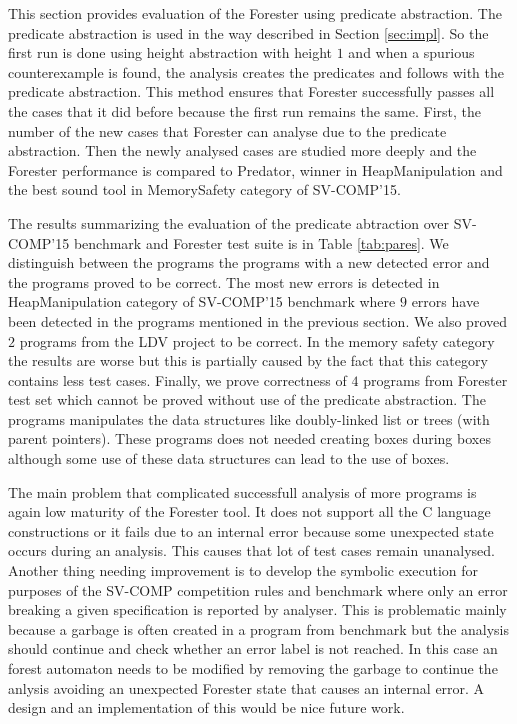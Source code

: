 This section provides evaluation of the Forester using predicate abstraction.
The predicate abstraction is used in the way described in Section \ref{sec:impl}.
So the first run is done using height abstraction with height $1$ and when a spurious
counterexample is found, the analysis creates the predicates and follows with
the predicate abstraction.
This method ensures that Forester successfully passes all the cases that it did
before because the first run remains the same.
First, the number of the new cases that Forester can analyse due to
the predicate abstraction.
Then the newly analysed cases are studied more deeply and
the Forester performance is compared to Predator, winner in HeapManipulation
and the best sound tool in MemorySafety category of SV-COMP'15.

The results summarizing the evaluation of the predicate abtraction over SV-COMP'15
benchmark and Forester test suite is in Table \ref{tab:pares}.
We distinguish between the programs the programs with a new detected error
and the programs proved to be correct.
The most new errors is detected in HeapManipulation category of SV-COMP'15
benchmark where $9$ errors have been detected in the programs
mentioned in the previous section.
We also proved $2$ programs from the LDV project to be correct.
In the memory safety category the results are worse but this is partially caused
by the fact that this category contains less test cases.
Finally, we prove correctness of $4$ programs from Forester test set
which cannot be proved without use of the predicate abstraction.
The programs manipulates the data structures like doubly-linked list
or trees (with parent pointers).
These programs does not needed creating boxes during boxes although
some use of these data structures can lead to the use of boxes.

The main problem that complicated successfull analysis of
more programs is again low maturity of the Forester tool.
It does not support all the C language constructions
or it fails due to an internal error because some unexpected
state occurs during an analysis.
This causes that lot of test cases remain unanalysed.
Another thing needing improvement is to develop the symbolic
execution for purposes of the SV-COMP competition rules and benchmark
where only an error breaking a given specification is reported
by analyser.
This is problematic mainly because a garbage is often created
in a program from benchmark but the analysis should continue
and check whether an error label is not reached.
In this case an forest automaton needs to be modified
by removing the garbage to continue the anlysis avoiding
an unexpected Forester state that causes an internal error.
A design and an implementation of this would be nice future work.

